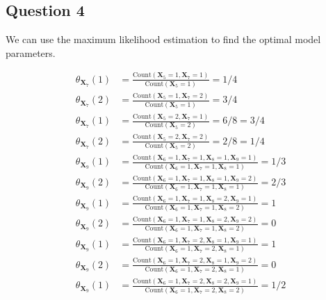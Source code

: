 \documentclass[11pt,fancychapters]{article}
\begin{document}
\subsection*{Question 4}

We can use the maximum likelihood estimation to find the optimal model parameters.

\begin{align*}
	\theta_{\mathbf{X}_7}(1) &= \frac{\text{Count}(\mathbf{X}_5 = 1, \mathbf{X}_7 = 1)}{\text{Count}(\mathbf{X}_5 = 1)} = 1/4 \\
	\theta_{\mathbf{X}_7}(2) &= \frac{\text{Count}(\mathbf{X}_5 = 1, \mathbf{X}_7 = 2)}{\text{Count}(\mathbf{X}_5 = 1)} = 3/4 \\
	\theta_{\mathbf{X}_7}(1) &= \frac{\text{Count}(\mathbf{X}_5 = 2, \mathbf{X}_7 = 1)}{\text{Count}(\mathbf{X}_5 = 2)} = 6/8 = 3/4 \\
	\theta_{\mathbf{X}_7}(2) &= \frac{\text{Count}(\mathbf{X}_5 = 2, \mathbf{X}_7 = 2)}{\text{Count}(\mathbf{X}_5 = 2)} = 2/8 = 1/4 \\
	\theta_{\mathbf{X}_9}(1) &= \frac{\text{Count}(\mathbf{X}_6 = 1, \mathbf{X}_7 = 1, \mathbf{X}_8 = 1, \mathbf{X}_9 = 1)}{\text{Count}(\mathbf{X}_6 = 1, \mathbf{X}_7 = 1, \mathbf{X}_8 = 1)} = 1/3 \\
	\theta_{\mathbf{X}_9}(2) &= \frac{\text{Count}(\mathbf{X}_6 = 1, \mathbf{X}_7 = 1, \mathbf{X}_8 = 1, \mathbf{X}_9 = 2)}{\text{Count}(\mathbf{X}_6 = 1, \mathbf{X}_7 = 1, \mathbf{X}_8 = 1)} = 2/3 \\
	\theta_{\mathbf{X}_9}(1) &= \frac{\text{Count}(\mathbf{X}_6 = 1, \mathbf{X}_7 = 1, \mathbf{X}_8 = 2, \mathbf{X}_9 = 1)}{\text{Count}(\mathbf{X}_6 = 1, \mathbf{X}_7 = 1, \mathbf{X}_8 = 2)} = 1 \\
	\theta_{\mathbf{X}_9}(2) &= \frac{\text{Count}(\mathbf{X}_6 = 1, \mathbf{X}_7 = 1, \mathbf{X}_8 = 2, \mathbf{X}_9 = 2)}{\text{Count}(\mathbf{X}_6 = 1, \mathbf{X}_7 = 1, \mathbf{X}_8 = 2)} = 0 \\
	\theta_{\mathbf{X}_9}(1) &= \frac{\text{Count}(\mathbf{X}_6 = 1, \mathbf{X}_7 = 2, \mathbf{X}_8 = 1, \mathbf{X}_9 = 1)}{\text{Count}(\mathbf{X}_6 = 1, \mathbf{X}_7 = 2, \mathbf{X}_8 = 1)} = 1 \\
	\theta_{\mathbf{X}_9}(2) &= \frac{\text{Count}(\mathbf{X}_6 = 1, \mathbf{X}_7 = 2, \mathbf{X}_8 = 1, \mathbf{X}_9 = 2)}{\text{Count}(\mathbf{X}_6 = 1, \mathbf{X}_7 = 2, \mathbf{X}_8 = 1)} = 0 \\
	\theta_{\mathbf{X}_9}(1) &= \frac{\text{Count}(\mathbf{X}_6 = 1, \mathbf{X}_7 = 2, \mathbf{X}_8 = 2, \mathbf{X}_9 = 1)}{\text{Count}(\mathbf{X}_6 = 1, \mathbf{X}_7 = 2, \mathbf{X}_8 = 2)} = 1/2 \\

\end{align*}
\end{document}
